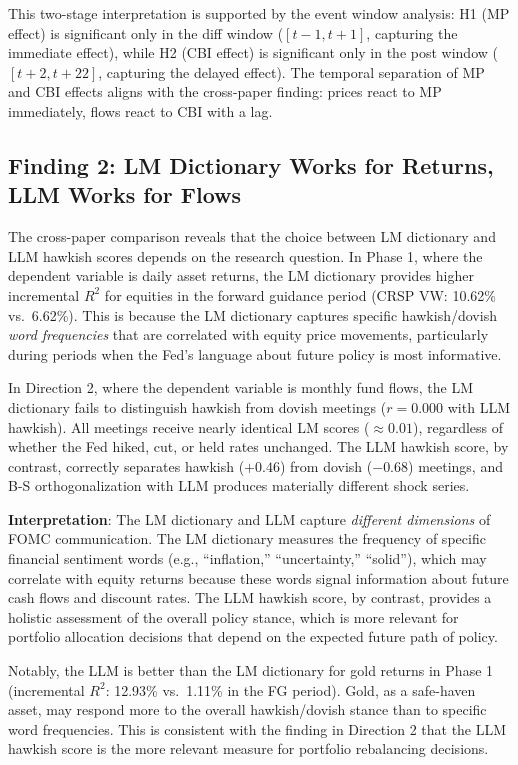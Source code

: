 \documentclass[11pt,a4paper]{article}
\begin{document}
This two-stage interpretation is supported by the event window analysis: H1 (MP effect) is significant only in the diff window ($[t-1, t+1]$, capturing the immediate effect), while H2 (CBI effect) is significant only in the post window ($[t+2, t+22]$, capturing the delayed effect). The temporal separation of MP and CBI effects aligns with the cross-paper finding: prices react to MP immediately, flows react to CBI with a lag.

\subsection{Finding 2: LM Dictionary Works for Returns, LLM Works for Flows}
\label{sec:finding2}

The cross-paper comparison reveals that the choice between LM dictionary and LLM hawkish scores depends on the research question. In Phase 1, where the dependent variable is daily asset returns, the LM dictionary provides higher incremental $R^2$ for equities in the forward guidance period (CRSP VW: 10.62\% vs.\ 6.62\%). This is because the LM dictionary captures specific hawkish/dovish \textit{word frequencies} that are correlated with equity price movements, particularly during periods when the Fed's language about future policy is most informative.

In Direction 2, where the dependent variable is monthly fund flows, the LM dictionary fails to distinguish hawkish from dovish meetings ($r = 0.000$ with LLM hawkish). All meetings receive nearly identical LM scores ($\approx 0.01$), regardless of whether the Fed hiked, cut, or held rates unchanged. The LLM hawkish score, by contrast, correctly separates hawkish ($+0.46$) from dovish ($-0.68$) meetings, and B-S orthogonalization with LLM produces materially different shock series.

\textbf{Interpretation}: The LM dictionary and LLM capture \textit{different dimensions} of FOMC communication. The LM dictionary measures the frequency of specific financial sentiment words (e.g., ``inflation,'' ``uncertainty,'' ``solid''), which may correlate with equity returns because these words signal information about future cash flows and discount rates. The LLM hawkish score, by contrast, provides a holistic assessment of the overall policy stance, which is more relevant for portfolio allocation decisions that depend on the expected future path of policy.

Notably, the LLM is better than the LM dictionary for gold returns in Phase 1 (incremental $R^2$: 12.93\% vs.\ 1.11\% in the FG period). Gold, as a safe-haven asset, may respond more to the overall hawkish/dovish stance than to specific word frequencies. This is consistent with the finding in Direction 2 that the LLM hawkish score is the more relevant measure for portfolio rebalancing decisions.
\end{document}
